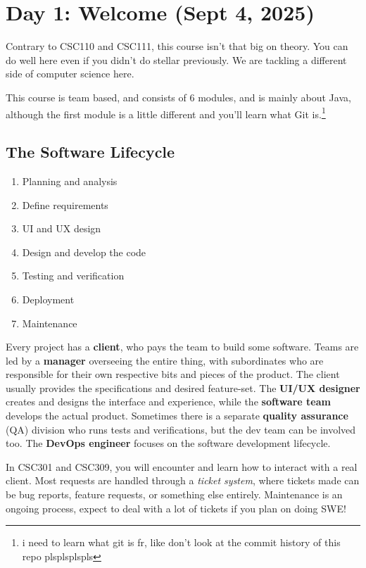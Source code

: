 \section{Day 1: Welcome (Sept 4, 2025)}

Contrary to CSC110 and CSC111, this course isn't that big on theory. You can do well here even if you didn't do stellar previously. We are tackling a different side of computer science here.

This course is team based, and consists of 6 modules, and is mainly about Java, although the first module is a little different and you'll learn what Git is.\footnote{i need to learn what git is fr, like don't look at the commit history of this repo plsplsplspls}

\subsection{The Software Lifecycle}
\begin{enumerate}
\item Planning and analysis
\item Define requirements
\item UI and UX design
\item Design and develop the code
\item Testing and verification
\item Deployment
\item Maintenance
\end{enumerate}
Every project has a \textbf{client}, who pays the team to build some software. Teams are led by a \textbf{manager} overseeing the entire thing, with subordinates who are responsible for their own respective bits and pieces of the product. The client usually provides the specifications and desired feature-set. The \textbf{UI/UX designer} creates and designs the interface and experience, while the \textbf{software team} develops the actual product. Sometimes there is a separate \textbf{quality assurance} (QA) division who runs tests and verifications, but the dev team can be involved too. The \textbf{DevOps engineer} focuses on the software development lifecycle.

In CSC301 and CSC309, you will encounter and learn how to interact with a real client. Most requests are handled through a \textit{ticket system}, where tickets made can be bug reports, feature requests, or something else entirely. Maintenance is an ongoing process, expect to deal with a lot of tickets if you plan on doing SWE!

